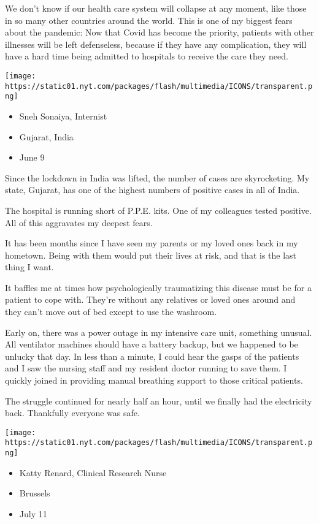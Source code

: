 We don't know if our health care system will collapse at any moment,
like those in so many other countries around the world. This is one of
my biggest fears about the pandemic: Now that Covid has become the
priority, patients with other illnesses will be left defenseless,
because if they have any complication, they will have a hard time being
admitted to hospitals to receive the care they need.

\texttt{[image: https://static01.nyt.com/packages/flash/multimedia/ICONS/transparent.png]}

\begin{itemize}
\tightlist
\item
  Sneh Sonaiya, Internist
\item
  Gujarat, India
\item
  June 9
\end{itemize}

Since the lockdown in India was lifted, the number of cases are
skyrocketing. My state, Gujarat, has one of the highest numbers of
positive cases in all of India.

The hospital is running short of P.P.E. kits. One of my colleagues
tested positive. All of this aggravates my deepest fears.

It has been months since I have seen my parents or my loved ones back in
my hometown. Being with them would put their lives at risk, and that is
the last thing I want.

It baffles me at times how psychologically traumatizing this disease
must be for a patient to cope with. They're without any relatives or
loved ones around and they can't move out of bed except to use the
washroom.

Early on, there was a power outage in my intensive care unit, something
unusual. All ventilator machines should have a battery backup, but we
happened to be unlucky that day. In less than a minute, I could hear the
gasps of the patients and I saw the nursing staff and my resident doctor
running to save them. I quickly joined in providing manual breathing
support to those critical patients.

The struggle continued for nearly half an hour, until we finally had the
electricity back. Thankfully everyone was safe.

\texttt{[image: https://static01.nyt.com/packages/flash/multimedia/ICONS/transparent.png]}

\begin{itemize}
\tightlist
\item
  Katty Renard, Clinical Research Nurse
\item
  Brussels
\item
  July 11
\end{itemize}

